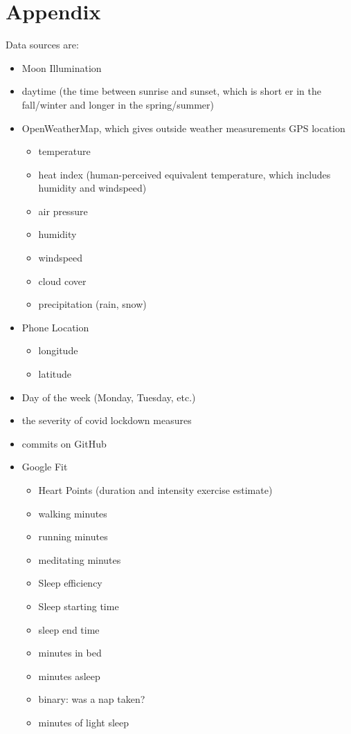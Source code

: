 \documentclass[conference]{IEEEtran}
\begin{document}
\section{Appendix}
\label{sec:Appendix}

Data sources are:
\begin{itemize}
\item Moon Illumination
\item daytime (the time between sunrise and sunset, which is short er in the fall/winter and longer in the spring/summer)
\item OpenWeatherMap, which gives outside weather measurements GPS location 
   \begin{itemize}
\item temperature
\item heat index (human-perceived equivalent temperature, which includes humidity and windspeed)
\item air pressure
\item humidity
\item windspeed
\item cloud cover
\item precipitation (rain, snow)
\end{itemize}
\item Phone Location
   \begin{itemize}
\item longitude
\item latitude
\end{itemize}
\item Day of the week (Monday, Tuesday, etc.)
\item the severity of covid lockdown measures
\item commits on GitHub
\item Google Fit
   \begin{itemize}
\item Heart Points (duration and intensity exercise estimate)
\item walking minutes
\item running minutes
\item meditating minutes
\item Sleep efficiency
\item Sleep starting time
\item sleep end time
\item minutes in bed
\item minutes asleep
\item binary: was a nap taken?
\item minutes of light sleep

\end{itemize}
\end{itemize}
\end{document}
